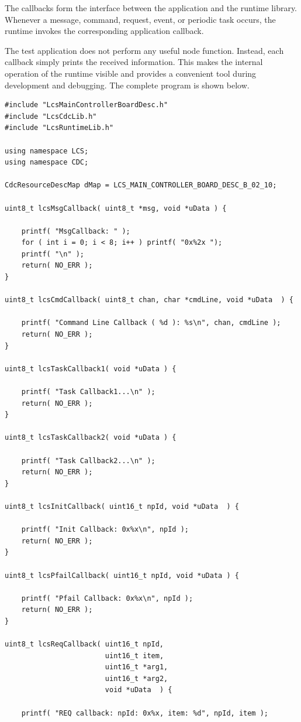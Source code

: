 The callbacks form the interface between the application and the runtime
library. Whenever a message, command, request, event, or periodic task occurs,
the runtime invokes the corresponding application callback.

The test application does not perform any useful node function. Instead, each
callback simply prints the received information. This makes the internal
operation of the runtime visible and provides a convenient tool during
development and debugging. The complete program is shown below.

\begin{lstlisting}[style=codesnippetstyle]
#include "LcsMainControllerBoardDesc.h"
#include "LcsCdcLib.h"
#include "LcsRuntimeLib.h"

using namespace LCS;
using namespace CDC;

CdcResourceDescMap dMap = LCS_MAIN_CONTROLLER_BOARD_DESC_B_02_10;

uint8_t lcsMsgCallback( uint8_t *msg, void *uData ) {

    printf( "MsgCallback: " );
    for ( int i = 0; i < 8; i++ ) printf( "0x%2x ");
    printf( "\n" );
    return( NO_ERR );
}

uint8_t lcsCmdCallback( uint8_t chan, char *cmdLine, void *uData  ) {

    printf( "Command Line Callback ( %d ): %s\n", chan, cmdLine );
    return( NO_ERR );
}

uint8_t lcsTaskCallback1( void *uData ) {

    printf( "Task Callback1...\n" );
    return( NO_ERR );    
}

uint8_t lcsTaskCallback2( void *uData ) {

    printf( "Task Callback2...\n" );
    return( NO_ERR );    
}

uint8_t lcsInitCallback( uint16_t npId, void *uData  ) {

    printf( "Init Callback: 0x%x\n", npId );
    return( NO_ERR );
}

uint8_t lcsPfailCallback( uint16_t npId, void *uData ) {

    printf( "Pfail Callback: 0x%x\n", npId );
    return( NO_ERR );
}

uint8_t lcsReqCallback( uint16_t npId, 
                        uint16_t item, 
                        uint16_t *arg1, 
                        uint16_t *arg2, 
                        void *uData  ) {

    printf( "REQ callback: npId: 0x%x, item: %d", npId, item );


\end{lstlisting}
